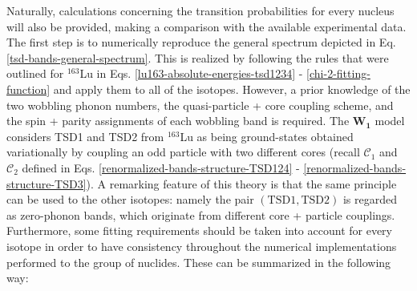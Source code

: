 Naturally, calculations concerning the transition probabilities for every nucleus will also be provided, making a comparison with the available experimental data. The first step is to numerically reproduce the general spectrum depicted in Eq. \ref{tsd-bands-general-spectrum}. This is realized by following the rules that were outlined for $^{163}$Lu in Eqs. \ref{lu163-absolute-energies-tsd1234} - \ref{chi-2-fitting-function} and apply them to all of the isotopes. However, a prior knowledge of the two wobbling phonon numbers, the quasi-particle + core coupling scheme, and the spin + parity assignments of each wobbling band is required. The $\mathbf{W_1}$ model considers TSD1 and TSD2 from $^{163}$Lu as being ground-states obtained variationally by coupling an odd particle with two different cores (recall $\mathscr{C}_1$ and $\mathscr{C}_2$ defined in Eqs. \ref{renormalized-bands-structure-TSD124} - \ref{renormalized-bands-structure-TSD3}). A remarking feature of this theory is that the same principle can be used to the other isotopes: namely the pair $(\text{TSD1},\text{TSD2})$ is regarded as zero-phonon bands, which originate from different core + particle couplings. Furthermore, some fitting requirements should be taken into account for every isotope in order to have consistency throughout the numerical implementations performed to the group of nuclides. These can be summarized in the following way:
